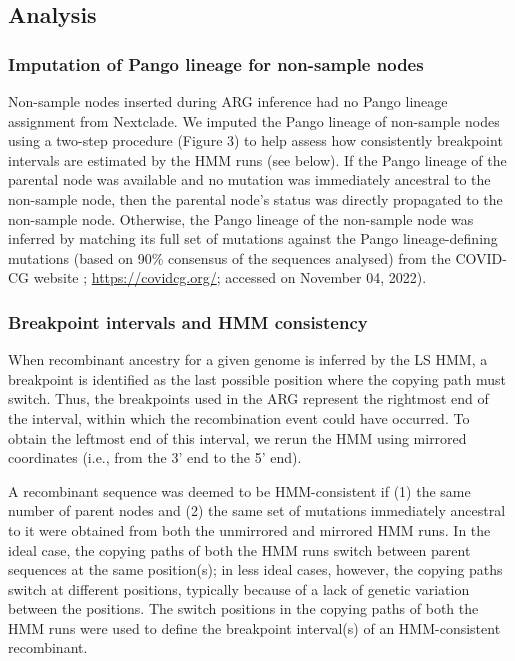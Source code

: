 \documentclass{article}
\begin{document}
\subsection{Analysis}

\subsubsection{Imputation of Pango lineage for non-sample nodes}

Non-sample nodes inserted during ARG inference had no Pango lineage assignment
from Nextclade. We imputed the Pango lineage of non-sample nodes using a
two-step procedure (Figure 3) to help assess how consistently breakpoint
intervals are estimated by the HMM runs (see below). If the Pango lineage of
the parental node was available and no mutation was immediately ancestral to
the non-sample node, then the parental node’s status was directly propagated to
the non-sample node. Otherwise, the Pango lineage of the non-sample node was
inferred by matching its full set of mutations against the Pango
lineage-defining mutations (based on 90\% consensus of the sequences analysed)
from the COVID-CG website \citep{Chen2021-zc}; \url{https://covidcg.org/};
accessed on November 04, 2022).

\subsubsection{Breakpoint intervals and HMM consistency}

When recombinant ancestry for a given genome is inferred by the LS HMM, a
breakpoint is identified as the last possible position where the copying path
must switch. Thus, the breakpoints used in the ARG represent the rightmost end
of the interval, within which the recombination event could have occurred. To
obtain the leftmost end of this interval, we rerun the HMM using mirrored
coordinates (i.e., from the 3’ end to the 5’ end).

A recombinant sequence was deemed to be HMM-consistent if (1) the same number
of parent nodes and (2) the same set of mutations immediately ancestral to it
were obtained from both the unmirrored and mirrored HMM runs. In the ideal
case, the copying paths of both the HMM runs switch between parent sequences at
the same position(s); in less ideal cases, however, the copying paths switch at
different positions, typically because of a lack of genetic variation between
the positions. The switch positions in the copying paths of both the HMM runs
were used to define the breakpoint interval(s) of an HMM-consistent
recombinant.
\end{document}
